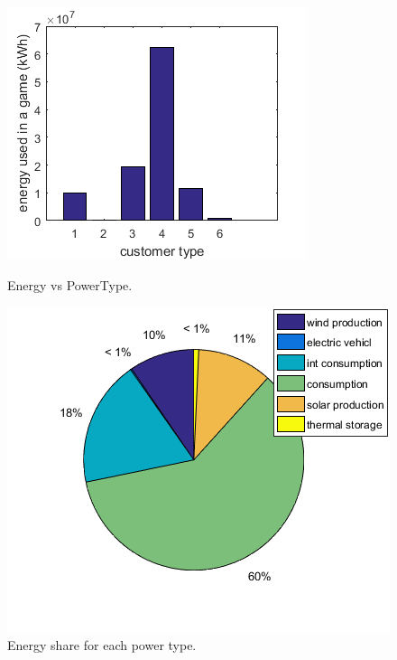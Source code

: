 \begin{figure}
\centering
\begin{minipage}{.5\textwidth}
  \includegraphics[width=\linewidth]{3-energy-vs-powertype.png}
  \caption{Energy vs PowerType.}
  \label{fig:energy-pt}
\end{minipage}%
\begin{minipage}{.5\textwidth}
  \includegraphics[width=\linewidth]{pie-energy-share.png}
  \caption{Energy share for each power type.}
  \label{fig:energy-shares}
\end{minipage}

\end{figure}